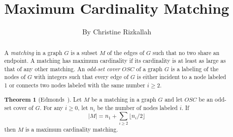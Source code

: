 \documentclass[11pt,a4paper]{article}
\theoremstyle{definition}
\newtheorem{theorem}{Theorem}
\newcommand{\OSC}{\mathit{OSC}}
\newcommand{\abs}[1]{\left\lvert #1 \right\rvert}
\begin{document}
\title{Maximum Cardinality Matching}
\author{By Christine Rizkallah}
\maketitle

\begin{abstract}

A \emph{matching} in a graph $G$ is a subset $M$ of the edges of $G$ such that 
no two share an endpoint.  
A matching has maximum cardinality if its cardinality is at least as large as
that of any other matching.  
An \emph{odd-set cover} $\OSC$ of a graph $G$ is a labeling of the nodes of $G$
with integers such that every edge of $G$ is either incident to a node labeled 1 or connects two nodes labeled with the same number $i \ge 2$.

\begin{theorem}[Edmonds~\cite{Edmonds:matching}]

\label{thm-edm}
Let $M$ be a matching in a graph $G$ and let $OSC$ be an odd-set cover of $G$.
For any $i \ge 0$, let $n_i$ be the number of nodes labeled $i$. If 
$$\abs{M} = n_1 + \sum_{i\ge 2}\lfloor n_i/2 \rfloor$$
then $M$ is a maximum cardinality matching.
\end{theorem}


\end{abstract}
\end{document}
